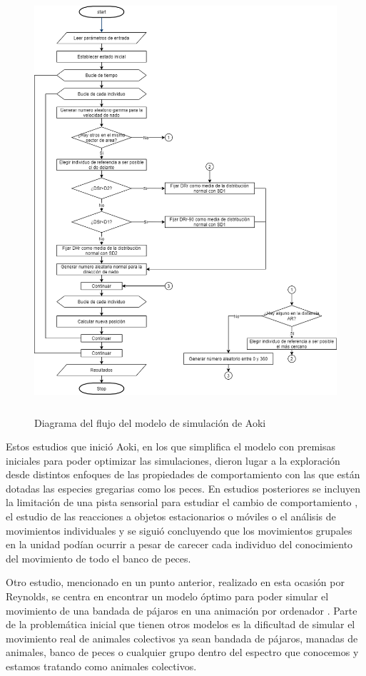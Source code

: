 \begin{figure}[h!]
    \centering
    {\includegraphics[height=15cm]{fig/cap02/AlgoritmoAoki.png}}
    \caption{Diagrama del flujo del modelo de simulación de Aoki}
    \label{fig:flowchartAoki}
\end{figure}

Estos estudios que inició Aoki, en los que simplifica el modelo con premisas iniciales para poder optimizar las simulaciones, dieron lugar a la exploración desde distintos enfoques de las propiedades de comportamiento con las que están dotadas las especies gregarias como los peces. En estudios posteriores se incluyen la limitación de una pista sensorial para estudiar el cambio de comportamiento \cite{partridge1980sensory,Pitcher963blindfish}, el estudio de las reacciones a objetos estacionarios o móviles \cite{shaw1971optomotor} o el análisis de movimientos individuales y se siguió concluyendo que los movimientos grupales en la unidad podían ocurrir a pesar de carecer cada individuo del conocimiento del movimiento de todo el banco de peces.

Otro estudio, mencionado en un punto anterior, realizado en esta ocasión por Reynolds, se centra en encontrar un modelo óptimo para poder simular el movimiento de una bandada de pájaros en una animación por ordenador \cite{reynolds1987flocks}. Parte de la problemática inicial que tienen otros modelos es la dificultad de simular el movimiento real de animales colectivos ya sean bandada de pájaros, manadas de animales, banco de peces o cualquier grupo dentro del espectro que conocemos y estamos tratando como animales colectivos.

